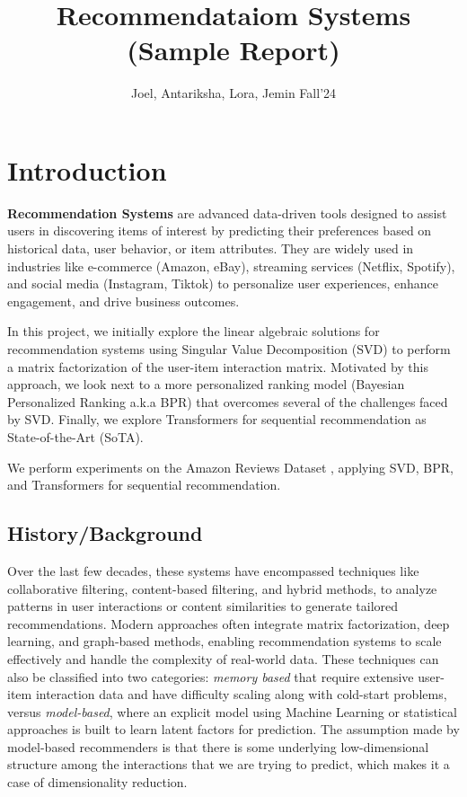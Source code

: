 \documentclass{article}
\title{Recommendataiom Systems (Sample Report)}
\author{%
  Joel, Antariksha, Lora, Jemin Fall'24
}
\begin{document}
\maketitle

\section{Introduction}
\textbf{Recommendation Systems} are advanced data-driven tools designed to assist users in discovering items of interest by predicting their preferences based on historical data, user behavior, or item attributes. They are widely used in industries like e-commerce (Amazon, eBay), streaming services (Netflix, Spotify), and social media (Instagram, Tiktok) to personalize user experiences, enhance engagement, and drive business outcomes.

In this project, we initially explore the linear algebraic solutions for recommendation systems using Singular Value Decomposition (SVD) to perform a matrix factorization of the user-item interaction matrix. Motivated by this approach, we look next to a more personalized ranking model (Bayesian Personalized Ranking a.k.a BPR) \cite{bpr} that overcomes several of the challenges faced by SVD. Finally, we explore Transformers for sequential recommendation as State-of-the-Art (SoTA).

We perform experiments on the Amazon Reviews Dataset \cite{hou2024bridginglanguageitemsretrieval}, applying SVD, BPR, and Transformers for sequential recommendation.


\subsection{History/Background}
Over the last few decades, these systems have encompassed techniques like collaborative filtering, content-based filtering, and hybrid methods, to analyze patterns in user interactions or content similarities to generate tailored recommendations. Modern approaches often integrate matrix factorization, deep learning, and graph-based methods, enabling recommendation systems to scale effectively and handle the complexity of real-world data. These techniques can also be classified into two categories: \textit{memory based} that require extensive user-item interaction data and have difficulty scaling along with cold-start problems, versus \textit{model-based}, where an explicit model using Machine Learning or statistical approaches is built to learn latent factors for prediction. The assumption made by model-based recommenders is that there is some underlying low-dimensional structure among the interactions that we are trying to predict, which makes it a case of dimensionality reduction.
\end{document}
